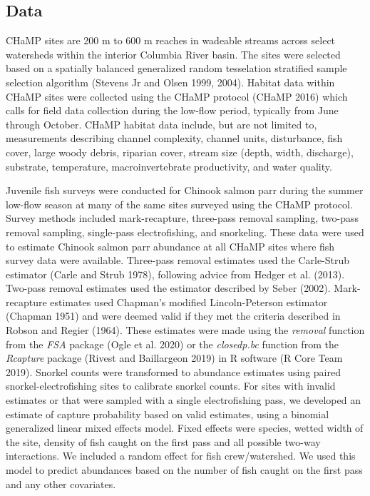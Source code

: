 \documentclass[
  12pt,
]{article}
\begin{document}
\hypertarget{data}{%
\subsection{Data}\label{data}}

CHaMP sites are 200 m to 600 m reaches in wadeable streams across select watersheds within the interior Columbia River basin. The sites were selected based on a spatially balanced generalized random tesselation stratified sample selection algorithm (Stevens Jr and Olsen 1999, 2004). Habitat data within CHaMP sites were collected using the CHaMP protocol (CHaMP 2016) which calls for field data collection during the low-flow period, typically from June through October. CHaMP habitat data include, but are not limited to, measurements describing channel complexity, channel units, disturbance, fish cover, large woody debris, riparian cover, stream size (depth, width, discharge), substrate, temperature, macroinvertebrate productivity, and water quality.

Juvenile fish surveys were conducted for Chinook salmon parr during the summer low-flow season at many of the same sites surveyed using the CHaMP protocol. Survey methods included mark-recapture, three-pass removal sampling, two-pass removal sampling, single-pass electrofishing, and snorkeling. These data were used to estimate Chinook salmon parr abundance at all CHaMP sites where fish survey data were available. Three-pass removal estimates used the Carle-Strub estimator (Carle and Strub 1978), following advice from Hedger et al. (2013). Two-pass removal estimates used the estimator described by Seber (2002). Mark-recapture estimates used Chapman's modified Lincoln-Peterson estimator (Chapman 1951) and were deemed valid if they met the criteria described in Robson and Regier (1964). These estimates were made using the \emph{removal} function from the \emph{FSA} package (Ogle et al. 2020) or the \emph{closedp.bc} function from the \emph{Rcapture} package (Rivest and Baillargeon 2019) in R software (R Core Team 2019). Snorkel counts were transformed to abundance estimates using paired snorkel-electrofishing sites to calibrate snorkel counts. For sites with invalid estimates or that were sampled with a single electrofishing pass, we developed an estimate of capture probability based on valid estimates, using a binomial generalized linear mixed effects model. Fixed effects were species, wetted width of the site, density of fish caught on the first pass and all possible two-way interactions. We included a random effect for fish crew/watershed. We used this model to predict abundances based on the number of fish caught on the first pass and any other covariates.
\end{document}
